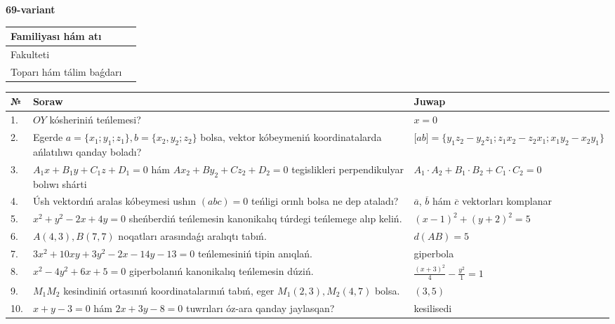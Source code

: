 \documentclass{article}
\begin{document}
\egroup

\newpage


\textbf{69-variant}\\

\bgroup
\def\arraystretch{1.6} %

\begin{tabular}{|m{5.7cm}|m{9.5cm}|}
\hline
Familiyası hám atı & \\
\hline
Fakulteti  & \\
\hline
Toparı hám tálim baǵdarı  & \\
\hline
\end{tabular}

\vspace{1cm}

\begin{tabular}{|m{0.7cm}|m{10cm}|m{4cm}|}
\hline
№ & Soraw & Juwap \\
\hline
1. & $OY$ kósheriniń teńlemesi? & $x=0$ \\
\hline
2. & Egerde $a=\{ x_1; y_1; z_1\}, b=\{ x_2, y_2; z_2\}$ bolsa, vektor kóbeymeniń koordinatalarda ańlatılıwı qanday boladı? &  $\lbrack ab\rbrack=\{y_1z_2-y_2z_1; z_1x_2-z_2x_1; x_1y_2-x_2y_1\}$ \\
\hline
3. & $A_1x+B_1y+C_1z+D_1=0$ hám $Ax_2+By_2+Cz_2+D_2=0$ tegislikleri perpendikulyar bolıwı shárti & $A_1\cdot A_2+B_1\cdot B_2+C_1\cdot C_2=0$ \\
\hline
4. & Úsh vektordıń aralas kóbeymesi ushın $(abc)=0$ teńligi orınlı bolsa ne dep ataladı? & $\overline{a}$, $\overline{b}$ hám $\overline{c}$ vektorları komplanar \\
\hline
5. & $x^{2}+y^{2}-2x+4y=0$ sheńberdiń teńlemesin kanonikalıq túrdegi teńlemege alıp keliń. & $(x-1)^{2}+(y+2)^{2}=5$ \\
\hline
6. & $A(4, 3), B(7, 7)$ noqatları arasındaǵı aralıqtı tabıń. & $d(AB)=5$ \\
\hline
7. & $3x^{2}+10xy+3y^{2}-2x-14y-13=0$ teńlemesiniń tipin anıqlań. & giperbola \\
\hline
8. & $x^{2}-4y^{2}+6x+5=0$ giperbolanıń kanonikalıq teńlemesin dúziń. & $\frac{(x+3)^{2}}{4}-\frac{y^{2}}{1}=1$ \\
\hline
9. & $M_{1}M_{2}$ kesindiniń ortasınıń koordinatalarınıń tabıń, eger $M_{1} (2, 3), M_{2} (4, 7)$ bolsa. & $(3,5)$ \\
\hline
10. & $x+y-3=0$ hám $2x+3y-8=0$ tuwrıları óz-ara qanday jaylasqan? & kesilisedi \\
\hline
\end{tabular}
\end{document}
